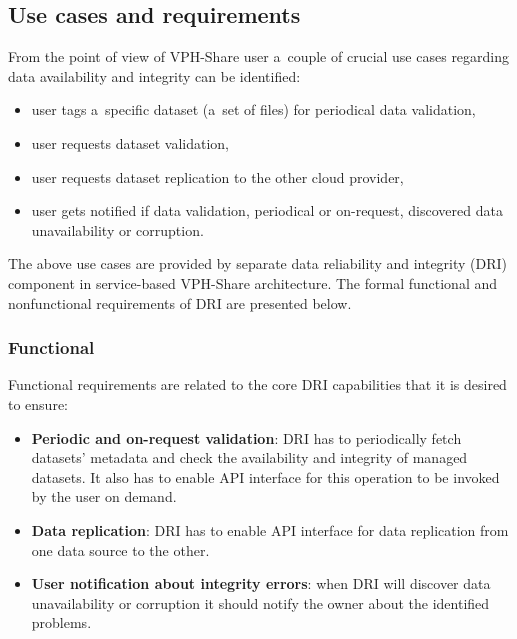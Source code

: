 \subsection{Use cases and requirements}
\label{requirements}

From the point of view of VPH-Share user a~couple of crucial use cases regarding data availability
and integrity can be identified:

\begin{itemize}
	\item user tags a~specific dataset (a~set of files) for periodical data validation,
	\item user requests dataset validation,
	\item user requests dataset replication to the other cloud provider,
	\item user gets notified if data validation, periodical or on-request, discovered data
	unavailability or corruption.
\end{itemize}

The above use cases are provided by separate data reliability and integrity (DRI) component
in service-based VPH-Share architecture. The formal functional and nonfunctional requirements
of DRI are presented below.

\subsubsection*{Functional}
Functional requirements are related to the core DRI capabilities that it
is desired to ensure:

\begin{itemize}
	\item \textbf{Periodic and on-request validation}: DRI has to periodically
	fetch datasets' metadata and check the availability and integrity of managed
	datasets. It also has to enable API interface for this operation to be invoked
	by the user on demand.
	\item \textbf{Data replication}: DRI has to enable API interface for data
	replication from one data source to the other. 
	\item \textbf{User notification about integrity errors}: when DRI will discover data
	unavailability or corruption it should notify the owner about the identified problems.
\end{itemize}

